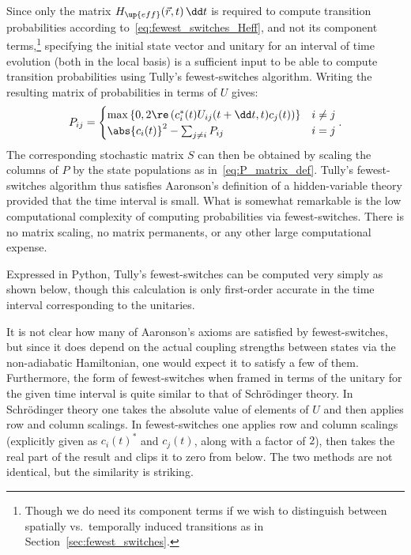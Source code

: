 Since only the matrix $H_\up{eff}(\vec r, t)\,\dd t$ is required to compute transition probabilities according to~\eqref{eq:fewest_switches_Heff}, and not its component terms,\footnote{Though we do need its component terms if we wish to distinguish between spatially vs.\ temporally induced transitions as in Section~\ref{sec:fewest_switches}.} specifying the initial state vector and unitary for an interval of time evolution (both in the local basis) is a sufficient input to be able to compute transition probabilities using Tully's fewest-switches algorithm. Writing the resulting matrix of probabilities in terms of $U$ gives:
\begin{align}
P_{ij} = \begin{cases}
\max\left\{0, 2\re\left(c_i^*(t)U_{ij}(t + \dd t, t)c_j(t)\right)\right\} & i \neq j\\
\abs{c_i(t)}^2 - \sum_{j\neq i} P_{ij} & i = j
\end{cases}.
\end{align}
The corresponding stochastic matrix $S$ can then be obtained by scaling the columns of $P$ by the state populations as in~\eqref{eq:P_matrix_def}. Tully's fewest-switches algorithm thus satisfies Aaronson's definition of a hidden-variable theory provided that the time interval is small. What is somewhat remarkable is the low computational complexity of computing probabilities via fewest-switches. There is no matrix scaling, no matrix permanents, or any other large computational expense.

Expressed in Python, Tully's fewest-switches can be computed very simply as shown below, though this calculation is only first-order accurate in the time interval corresponding to the unitaries.


It is not clear how many of Aaronson's axioms are satisfied by fewest-switches, but since it does depend on the actual coupling strengths between states via the non-adiabatic Hamiltonian, one would expect it to satisfy a few of them. Furthermore, the form of fewest-switches when framed in terms of the unitary for the given time interval is quite similar to that of Schr\"odinger theory. In Schr\"odinger theory one takes the absolute value of elements of $U$ and then applies row and column scalings. In fewest-switches one applies row and column scalings (explicitly given as $c_i(t)^*$ and $c_j(t)$, along with a factor of $2$), then takes the real part of the result and clips it to zero from below. The two methods are not identical, but the similarity is striking.

